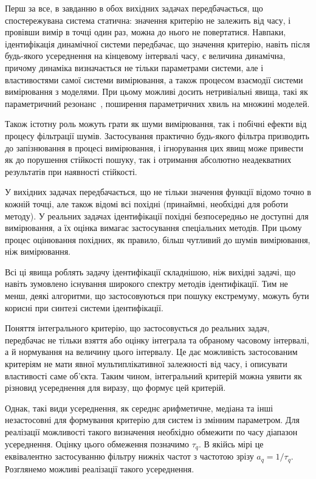 Перш за все, в завданню в обох вихідних задачах передбачається, що
спостережувана система статична: значення критерію не залежить від часу, і
провівши вимір в точці один раз, можна до нього не повертатися. Навпаки,
ідентифікація динамічної системи передбачає, що значення критерію, навіть після
будь-якого усереднення на кінцевому інтервалі часу, є величина динамічна,
причому динаміка визначається не тільки параметрами системи, але і
властивостями самої системи вимірювання, а також процесом взаємодії системи
вимірювання з моделями. При цьому можливі досить нетривіальні явища, такі як
параметричний резонанс~\cite{landau1}, поширення параметричних хвиль на множині моделей.

Також істотну роль можуть грати як шуми вимірювання, так і
побічні ефекти від процесу фільтрації шумів. Застосування
практично будь-якого фільтра призводить до запізнювання в
процесі вимірювання, і ігнорування цих явищ може привести
як до порушення стійкості пошуку, так і отримання абсолютно
неадекватних результатів при наявності стійкості.

У вихідних задачах передбачається, що не тільки значення
функції відомо точно в кожній точці, але також відомі всі
похідні (принаймні, необхідні для роботи методу). У реальних
задачах ідентифікації похідні безпосередньо не доступні для
вимірювання, а їх оцінка вимагає застосування спеціальних
методів. При цьому процес оцінювання похідних, як правило,
більш чутливий до шумів вимірювання, ніж вимірювання.




Всі ці явища роблять задачу ідентифікації складнішою, ніж
вихідні задачі, що навіть зумовлено існування широкого
спектру методів ідентифікації. Тим не менш, деякі алгоритми,
що застосовуються при пошуку екстремуму, можуть бути корисні
при синтезі системи ідентифікації.


Поняття інтегрального критерію, що застосовується до реальних задач, передбачає
не тільки взяття або оцінку інтеграла та обраному часовому
інтервалі, а й нормування на величину цього інтервалу. Це дає можливість
застосованим критеріям не мати явної мультиплікативної залежності від часу, і
описувати властивості саме об'єкта. Таким чином, інтегральний критерій можна
уявити як різновид усереднення для виразу, що формує цей критерій.

Однак, такі види усереднення, як середнє арифметичне, медіана та
інші незастосовні для формування критерію для систем із змінним
параметром. Для реалізації можливості такого визначення
необхідно обмежити по часу діапазон усереднення. Оцінку
цього обмеження позначимо
\label{atu:d:tau_q}$\tau_q$.
В якійсь мірі це еквівалентно застосуванню фільтру нижніх
частот з частотою зрізу
\label{atu:d:a_q}$a_q = 1 / \tau_q$.
Розглянемо можливі реалізації такого усереднення.

